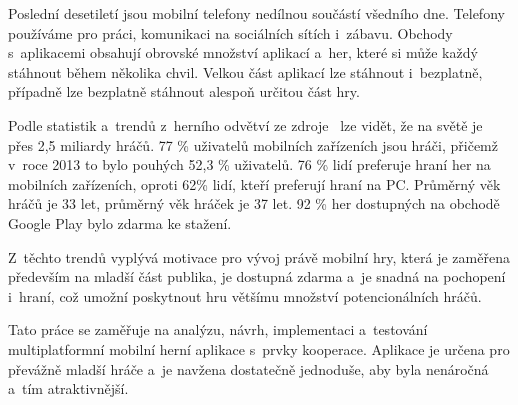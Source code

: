 \begin{introduction}
Poslední desetiletí jsou mobilní telefony nedílnou součástí všedního dne.
Telefony používáme pro práci, komunikaci na sociálních sítích i~zábavu.
Obchody s~aplikacemi obsahují obrovské množství aplikací a~her,
které si může každý stáhnout během několika chvil.
Velkou část aplikací lze stáhnout i~bezplatně,
případně lze bezplatně stáhnout alespoň určitou část hry.

Podle statistik a~trendů z~herního odvětví
ze zdroje~\cite{wepc_video_game_statistics} lze vidět,
že na světě je přes 2,5 miliardy hráčů.
77 \% uživatelů mobilních zařízeních jsou hráči,
přičemž v~roce 2013 to bylo pouhých 52,3 \% uživatelů.
76 \% lidí preferuje hraní her na mobilních zařízeních,
oproti 62\% lidí, kteří preferují hraní na PC.
Průměrný věk hráčů je 33 let, průměrný věk hráček je 37 let.
92 \% her dostupných na obchodě Google Play bylo
zdarma ke stažení.~\cite{wepc_video_game_statistics}

Z~těchto trendů vyplývá motivace pro vývoj právě mobilní hry,
která je zaměřena především na mladší část publika,
je dostupná zdarma a~je snadná na pochopení i~hraní,
což umožní poskytnout hru většímu množství potencionálních hráčů.

Tato práce se zaměřuje na analýzu, návrh, implementaci a~testování
multiplatformní mobilní herní aplikace s~prvky kooperace.
Aplikace je určena pro převážně mladší hráče
a~je navžena dostatečně jednoduše,
aby byla nenáročná a~tím atraktivnější.

\end{introduction}
